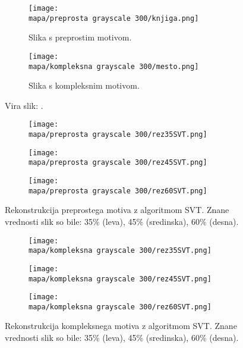 \renewcommand{\mapa}{Poglavja/Slike/kompleksnost}

\begin{figure}[!ht]
    \begin{subfigure}{0.5\linewidth}
        \texttt{[image: \\mapa/preprosta grayscale 300/knjiga.png]}
        \caption{Slika s preprostim motivom.}
    \end{subfigure}
    \hfill
    \begin{subfigure}{0.5\linewidth}
        \texttt{[image: \\mapa/kompleksna grayscale 300/mesto.png]}
        \caption{Slika s kompleksnim motivom.}
    \end{subfigure}
    \caption{Vira slik: \cite{UnsplashKnjiga,UnsplashMesto}.}
\end{figure}

\begin{figure}[!ht]
    \begin{subfigure}{0.325\linewidth}
        \texttt{[image: \\mapa/preprosta grayscale 300/rez35SVT.png]}
    \end{subfigure}
    \hfill
    \begin{subfigure}{0.325\linewidth}
        \texttt{[image: \\mapa/preprosta grayscale 300/rez45SVT.png]}
    \end{subfigure}
    \hfill
    \begin{subfigure}{0.325\linewidth}
        \texttt{[image: \\mapa/preprosta grayscale 300/rez60SVT.png]}
    \end{subfigure}
    \caption{Rekonstrukcija preprostega motiva z algoritmom SVT. Znane vrednosti slik so bile: 35\% (leva), 45\% (sredinska), 60\% (desna).}
\end{figure}
    
\begin{figure}[!ht]
    \begin{subfigure}{0.325\linewidth}
        \texttt{[image: \\mapa/kompleksna grayscale 300/rez35SVT.png]}
    \end{subfigure}
    \hfill
    \begin{subfigure}{0.325\linewidth}
        \texttt{[image: \\mapa/kompleksna grayscale 300/rez45SVT.png]}
    \end{subfigure}
    \hfill
    \begin{subfigure}{0.325\linewidth}
        \texttt{[image: \\mapa/kompleksna grayscale 300/rez60SVT.png]}
    \end{subfigure}
    \caption{Rekonstrukcija kompleksnega motiva z algoritmom SVT. Znane vrednosti slik so bile: 35\% (leva), 45\% (sredinska), 60\% (desna).}
\end{figure}

